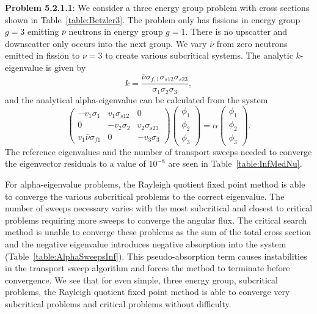 \textbf{Problem 5.2.1.1}: We consider a three energy group problem with cross sections shown in Table~\ref{table:Betzler3}. The problem only has fissions in energy group $g = 3$ emitting $\bar{\nu}$ neutrons in energy group $g = 1$. There is no upscatter and downscatter only occurs into the next group. We vary $\bar{\nu}$ from zero neutrons emitted in fission to $\bar{\nu} = 3$ to create various subcritical systems. The analytic $k$-eigenvalue is given by
\begin{equation}
	k = \frac{\bar{\nu} \sigma_{f,1} \sigma_{s12} \sigma_{s23}}{\sigma_{1} \sigma_{2} \sigma_{3}},
\end{equation}
and the analytical alpha-eigenvalue can be calculated from the system
\begin{equation}
	\begin{pmatrix}
		-v_{1} \sigma_{1} & v_{1} \sigma_{s12} & 0 \\
		0 & -v_{2} \sigma_{2} & v_{2} \sigma_{s23} \\
		v_{1} \bar{\nu} \sigma_{f1} & 0 & -v_{3} \sigma_{3}
	\end{pmatrix}
	\begin{pmatrix}
		\phi_{1} \\ \phi_{2} \\ \phi_{3}
	\end{pmatrix} = 
	\alpha
	\begin{pmatrix}
		\phi_{1} \\ \phi_{2} \\ \phi_{3}
	\end{pmatrix}.
\end{equation}
The reference eigenvalues and the number of transport sweeps needed to converge the eigenvector residuals to a value of $10^{-8}$ are seen in Table~\ref{table:InfMedNu}. 

For alpha-eigenvalue problems, the Rayleigh quotient fixed point method is able to converge the various subcritical problems to the correct eigenvalue. The number of sweeps necessary varies with the most subcritical and closest to critical problems requiring more sweeps to converge the angular flux. The critical search method is unable to converge these problems as the sum of the total cross section and the negative eigenvalue introduces negative absorption into the system (Table~\ref{table:AlphaSweepsInf}). This pseudo-absorption term causes instabilities in the transport sweep algorithm and forces the method to terminate before convergence. We see that for even simple, three energy group, subcritical problems, the Rayleigh quotient fixed point method is able to converge very subcritical problems and critical problems without difficulty.

